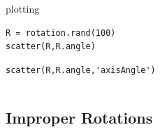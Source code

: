 \documentclass[compress]{beamer}
\begin{document}
\begin{frame}[fragile]
\begin{columns}
\begin{column}{8cm}
\begin{overlayarea}{8cm}{8cm}
\pause

plotting
\vspace{-0.2cm}
\begin{lstlisting}[style=input]
R = rotation.rand(100)
scatter(R,R.angle)
\end{lstlisting}

\pause

\begin{lstlisting}[style=input]
scatter(R,R.angle,'axisAngle')
\end{lstlisting}

\end{overlayarea}
\end{column}

\begin{column}{3.7cm}
  \vspace{-0.5cm}
\end{column}

\end{columns}

\end{frame}

\subsection*{Improper Rotations}
\end{document}
